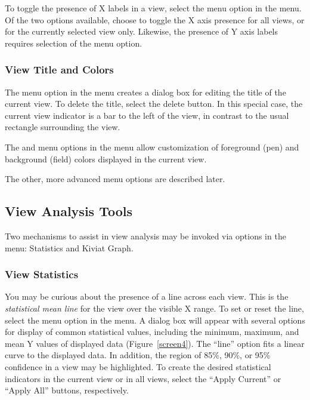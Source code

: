 To toggle the presence of X labels in a view, select the 
menu option in the  menu. Of the two options available, choose to
toggle the X axis presence for all views, or for the currently selected view
only. Likewise, the presence of Y axis labels requires selection of the
 menu option.

\subsubsection{View Title and Colors}

The  menu option in the  menu creates a dialog box for
editing the title of the current view. To delete the title, select the delete
button. In this special case, the current view indicator is a bar to the left of
the view, in contrast to the usual rectangle surrounding the view.

The  and  menu options in the
 menu allow customization of foreground (pen) and background (field)
colors displayed in the current view.

The other, more advanced  menu options are described later.


\subsection{View Analysis Tools}

Two mechanisms to assist in view analysis may be invoked via options in
the  menu: Statistics and Kiviat Graph.

\subsubsection{View Statistics}

You may be curious about the presence of a line across each view. This is the
{\em statistical mean line} for the view over the visible X range. To set or
reset the line, select the  menu option in the 
menu. A dialog box will appear with several options for display of common
statistical values, including the minimum, maximum, and mean Y values of
displayed data (Figure~\ref{screen4}). The ``line'' option fits a linear curve
to the displayed data.  In addition, the region of 85\%, 90\%, or 95\%
confidence in a view may be highlighted. To create the desired statistical
indicators in the current view or in all views, select the ``Apply Current'' or
``Apply All'' buttons, respectively.

